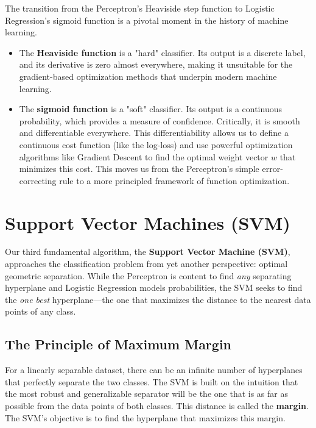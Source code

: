 \begin{remark}
The transition from the Perceptron's Heaviside step function to Logistic Regression's sigmoid function is a pivotal moment in the history of machine learning.
\begin{itemize}
    \item The \textbf{Heaviside function} is a "hard" classifier. Its output is a discrete label, and its derivative is zero almost everywhere, making it unsuitable for the gradient-based optimization methods that underpin modern machine learning.
    \item The \textbf{sigmoid function} is a "soft" classifier. Its output is a continuous probability, which provides a measure of confidence. Critically, it is smooth and differentiable everywhere. This differentiability allows us to define a continuous cost function (like the log-loss) and use powerful optimization algorithms like Gradient Descent to find the optimal weight vector $w$ that minimizes this cost. This moves us from the Perceptron's simple error-correcting rule to a more principled framework of function optimization.
\end{itemize}
\end{remark}

\section{Support Vector Machines (SVM)}
\label{sec:svm}
Our third fundamental algorithm, the \textbf{Support Vector Machine (SVM)}, approaches the classification problem from yet another perspective: optimal geometric separation. While the Perceptron is content to find \textit{any} separating hyperplane and Logistic Regression models probabilities, the SVM seeks to find the \textit{one best} hyperplane—the one that maximizes the distance to the nearest data points of any class.

\subsection*{The Principle of Maximum Margin}
For a linearly separable dataset, there can be an infinite number of hyperplanes that perfectly separate the two classes. The SVM is built on the intuition that the most robust and generalizable separator will be the one that is as far as possible from the data points of both classes. This distance is called the \textbf{margin}. The SVM's objective is to find the hyperplane that maximizes this margin.

